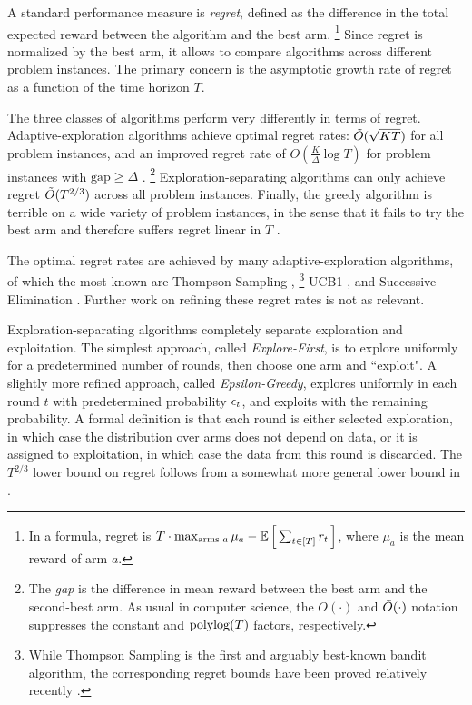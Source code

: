 A standard performance measure is \emph{regret}, defined as the difference in the total expected reward between the algorithm and the best arm.%
\footnote{In a formula, regret is
    $T\cdot \max_{\text{arms $a$}}\mu_a 
    -  \E\sbr{ \sum_{t\in[T]} r_t }$,
where $\mu_a$ is the mean reward of arm $a$.}
Since regret is normalized by the best arm, it allows to compare algorithms across different problem instances. 
The primary concern is the asymptotic growth rate of regret as a function of the time horizon $T$.

The three classes of algorithms perform very differently in terms of regret. Adaptive-exploration algorithms achieve optimal regret rates:
    $\tilde{O}(\sqrt{KT})$
for all problem instances, and an improved regret rate of
    $O(\tfrac{K}{\Delta}\log T)$
for problem instances with $\text{gap}\geq \Delta$
\citep{Lai-Robbins-85,bandits-ucb1,bandits-exp3}.%
\footnote{The \emph{gap} is the difference in mean reward between the best arm and the second-best arm. As usual in computer science, the $O(\cdot)$ and $\tilde{O}(\cdot)$ notation suppresses the constant and
$\polylog(T)$ factors, respectively.}
Exploration-separating algorithms can only achieve regret $\tilde{O}(T^{2/3})$ across all problem instances. Finally, the greedy algorithm is terrible on a wide variety of problem instances, in the sense that it fails to try the best arm and therefore suffers regret linear in $T$
\citep[see Chapter 11.2 in][]{slivkins-MABbook}.


The optimal regret rates are achieved by many adaptive-exploration  algorithms, of which the most known are
Thompson Sampling \citep{Thompson-1933,TS-survey-FTML18},%
\footnote{While Thompson Sampling is the first and arguably best-known bandit algorithm, the corresponding regret bounds have been proved relatively recently \citep{Shipra-colt12,Kaufmann-alt12,Shipra-aistats13}.}
UCB1 \citep{bandits-ucb1},
and Successive Elimination \citep{EvenDar-icml06}.
Further work on refining these regret rates is not as relevant.

Exploration-separating algorithms completely separate exploration and exploitation. The simplest approach, called \emph{Explore-First}, is to explore uniformly for a predetermined number of rounds, then choose one arm and ``exploit". A slightly more refined approach, called \emph{Epsilon-Greedy}, explores uniformly in each round $t$ with predetermined probability $\epsilon_t$, and exploits with the remaining probability. A formal definition is that each round is either selected exploration, in which case  the distribution over arms does not depend on data, or it is assigned to exploitation, in which case the data from this round is discarded. The $T^{2/3}$ lower bound on regret follows from a somewhat more general lower bound in \citet{MechMAB-ec09}.


